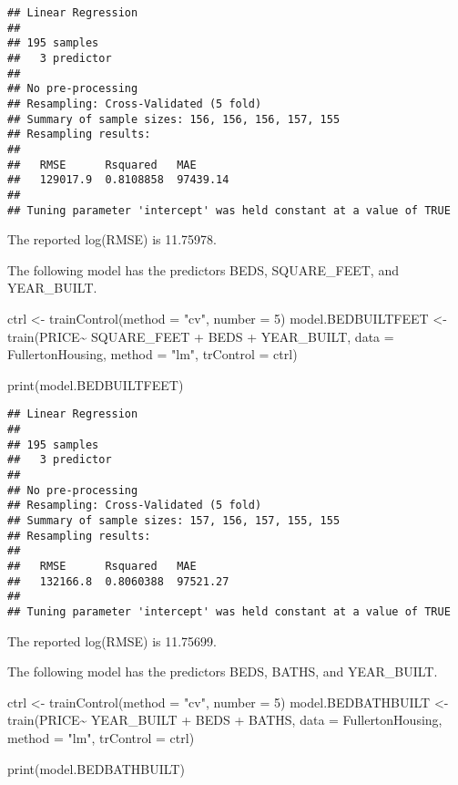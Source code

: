 \documentclass[
]{article}
\newenvironment{Shaded}{\begin{snugshade}}{\end{snugshade}}
\newcommand{\AttributeTok}[1]{\textcolor[rgb]{0.77,0.63,0.00}{#1}}
\newcommand{\DecValTok}[1]{\textcolor[rgb]{0.00,0.00,0.81}{#1}}
\newcommand{\FunctionTok}[1]{\textcolor[rgb]{0.00,0.00,0.00}{#1}}
\newcommand{\NormalTok}[1]{#1}
\newcommand{\OtherTok}[1]{\textcolor[rgb]{0.56,0.35,0.01}{#1}}
\newcommand{\SpecialCharTok}[1]{\textcolor[rgb]{0.00,0.00,0.00}{#1}}
\newcommand{\StringTok}[1]{\textcolor[rgb]{0.31,0.60,0.02}{#1}}
\begin{document}
\begin{verbatim}
## Linear Regression 
## 
## 195 samples
##   3 predictor
## 
## No pre-processing
## Resampling: Cross-Validated (5 fold) 
## Summary of sample sizes: 156, 156, 156, 157, 155 
## Resampling results:
## 
##   RMSE      Rsquared   MAE     
##   129017.9  0.8108858  97439.14
## 
## Tuning parameter 'intercept' was held constant at a value of TRUE
\end{verbatim}

The reported log(RMSE) is 11.75978.

The following model has the predictors BEDS, SQUARE\_FEET, and
YEAR\_BUILT.

\begin{Shaded}
\begin{Highlighting}[]
\NormalTok{ctrl }\OtherTok{\textless{}{-}} \FunctionTok{trainControl}\NormalTok{(}\AttributeTok{method =} \StringTok{"cv"}\NormalTok{, }\AttributeTok{number =} \DecValTok{5}\NormalTok{)}
\NormalTok{model.BEDBUILTFEET }\OtherTok{\textless{}{-}} \FunctionTok{train}\NormalTok{(PRICE}\SpecialCharTok{\textasciitilde{}}\NormalTok{ SQUARE\_FEET }\SpecialCharTok{+}\NormalTok{ BEDS }\SpecialCharTok{+}\NormalTok{ YEAR\_BUILT, }
               \AttributeTok{data =}\NormalTok{ FullertonHousing, }\AttributeTok{method =} \StringTok{"lm"}\NormalTok{, }\AttributeTok{trControl =}\NormalTok{ ctrl)}

\FunctionTok{print}\NormalTok{(model.BEDBUILTFEET)}
\end{Highlighting}
\end{Shaded}

\begin{verbatim}
## Linear Regression 
## 
## 195 samples
##   3 predictor
## 
## No pre-processing
## Resampling: Cross-Validated (5 fold) 
## Summary of sample sizes: 157, 156, 157, 155, 155 
## Resampling results:
## 
##   RMSE      Rsquared   MAE     
##   132166.8  0.8060388  97521.27
## 
## Tuning parameter 'intercept' was held constant at a value of TRUE
\end{verbatim}

The reported log(RMSE) is 11.75699.

The following model has the predictors BEDS, BATHS, and YEAR\_BUILT.

\begin{Shaded}
\begin{Highlighting}[]
\NormalTok{ctrl }\OtherTok{\textless{}{-}} \FunctionTok{trainControl}\NormalTok{(}\AttributeTok{method =} \StringTok{"cv"}\NormalTok{, }\AttributeTok{number =} \DecValTok{5}\NormalTok{)}
\NormalTok{model.BEDBATHBUILT }\OtherTok{\textless{}{-}} \FunctionTok{train}\NormalTok{(PRICE}\SpecialCharTok{\textasciitilde{}}\NormalTok{ YEAR\_BUILT }\SpecialCharTok{+}\NormalTok{ BEDS }\SpecialCharTok{+}\NormalTok{ BATHS, }
               \AttributeTok{data =}\NormalTok{ FullertonHousing, }\AttributeTok{method =} \StringTok{"lm"}\NormalTok{, }\AttributeTok{trControl =}\NormalTok{ ctrl)}

\FunctionTok{print}\NormalTok{(model.BEDBATHBUILT)}
\end{Highlighting}
\end{Shaded}
\end{document}
